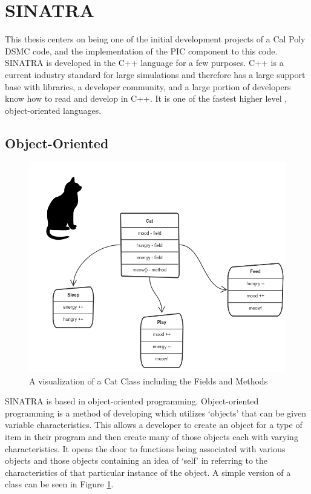 \section{SINATRA}

This thesis centers on being one of the initial development projects of a Cal Poly DSMC code, and the implementation of the PIC component to this code. SINATRA is developed in the C++ language for a few purposes. C++ is a current industry standard for large simulations and therefore has a large support base with libraries, a developer community, and a large portion of developers know how to read and develop in C++. It is one of the fastest higher level , object-oriented languages.  

\subsection{Object-Oriented}

\begin{figure}
    \centering
    \includegraphics[width=.95\textwidth]{figures/classes.png}
    \caption[A visualization of a Cat Class including the Fields and Methods]{A visualization of a Cat Class including the Fields and Methods \textmd{\cite{classes}}}
    \label{fig:classes}
\end{figure}

SINATRA is based in object-oriented programming. Object-oriented programming is a method of developing which utilizes `objects' that can be given variable characteristics. This allows a developer to create an object for a type of item in their program and then create many of those objects each with varying characteristics. It opens the door to functions being associated with various objects and those objects containing an idea of `self' in referring to the characteristics of that particular instance of the object. A simple version of a class can be seen in Figure \ref{fig:classes}. \par


